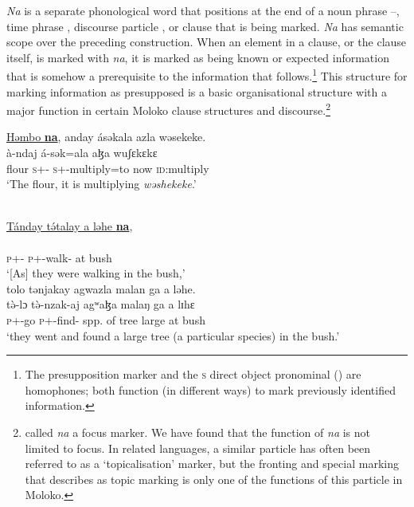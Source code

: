 \textit{Na} is a separate phonological word that positions at the end of a noun phrase --, time phrase , discourse particle , or clause  that is being marked. \textit{Na} has semantic scope over the preceding construction. When an element in a clause, or the clause itself, is marked with \textit{na}, it is marked as being known or expected information that is somehow a prerequisite to the information that follows.\footnote{The presupposition marker and the \textsc{s} direct object pronominal () are homophones; both function (in different ways) to mark previously identified information.} This structure for marking information as presupposed is a basic organisational structure with  a major function in certain Moloko clause structures and discourse.\footnote{\citet{Bow1997c} called \textit{na} a focus marker. We have found that the function of \textit{na} is not limited to focus. In related languages, a similar particle has often been referred to as a ‘topicalisation’ marker, but the fronting and special marking that \citet{Levinsohn1994} describes as topic marking is only one of the functions of this particle in Moloko.}

\ea \label{ex:11:3}
\underline{Həmbo  \textbf{na}},  anday  ásəkala  azla  wəsekeke.\\
\gll  {}   à-ndaj      á-sək=ala     aɮa   wuʃɛkɛkɛ\\
      flour  {\PSP}  \textsc{s}+{\PFV}-{\PRG}   \textsc{s}+{\IFV}-multiply=to  now    \textsc{id}:multiply\\
\glt  ‘The flour, it is multiplying \textit{wəshekeke}.’
\z

\ea \label{ex:11:4}
\\
\underline{Tánday  t\'ətalay  a  ləhe  \textbf{na}},\\  
\gll  {}    \\ 
      \textsc{p}+{\IFV}-{\PRG}  \textsc{p}+{\IFV}-walk{}-{\CL}  at  bush  {\PSP}\\
\glt ‘[As] they were walking in the bush,’\\
      
      \medskip
tolo  tənjakay  agwazla  malan  ga  a  ləhe.\\      
\gll t\`{ə}-lɔ t\`{ə}-nzak-aj agʷaɮa malaŋ ga a lɪhɛ\\
     \textsc{p}+{\PFV}-go \textsc{p}+{\PFV}-find{}-{\CL} {spp. of tree}  large {\ADJ} at bush\\
\glt  ‘they went and found a large tree (a particular species) in the bush.’
\z

